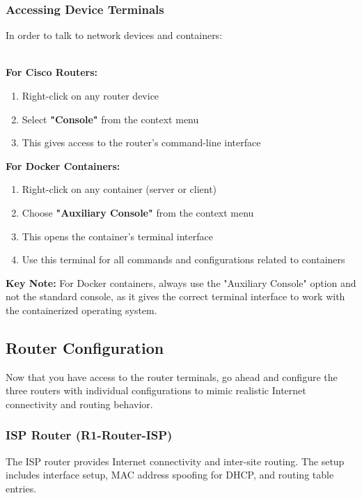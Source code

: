\subsubsection{Accessing Device Terminals}

In order to talk to network devices and containers:

\noindent
\\
\textbf{For Cisco Routers:}
\begin{enumerate}
    \item Right-click on any router device
    \item Select \textbf{"Console"} from the context menu
    \item This gives access to the router's command-line interface
\end{enumerate}

\noindent
\textbf{For Docker Containers:}
\begin{enumerate}
    \item Right-click on any container (server or client)
    \item Choose \textbf{"Auxiliary Console"} from the context menu
    \item This opens the container's terminal interface
    \item Use this terminal for all commands and configurations related to containers
\end{enumerate}

\textbf{Key Note:} For Docker containers, always use the "Auxiliary Console" option and not the standard console, as it gives the correct terminal interface to work with the containerized operating system.

\subsection{Router Configuration}

Now that you have access to the router terminals, go ahead and configure the three routers with individual configurations to mimic realistic Internet connectivity and routing behavior.

\subsubsection{ISP Router (R1-Router-ISP)}

The ISP router provides Internet connectivity and inter-site routing. The setup includes interface setup, MAC address spoofing for DHCP, and routing table entries.

